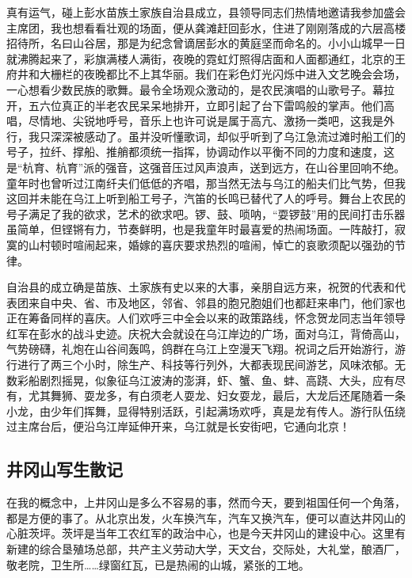 \documentclass{article}
\begin{document}
真有运气，碰上彭水苗族土家族自治县成立，县领导同志们热情地邀请我参加盛会主席团，我也想看看壮观的场面，便从龚滩赶回彭水，住进了刚刚落成的六层高楼招待所，名曰山谷居，那是为纪念曾谪居彭水的黄庭坚而命名的。小小山城早一日就沸腾起来了，彩旗满楼人满街，夜晚的霓虹灯照得店面和人面都通红，北京的王府井和大栅栏的夜晚都比不上其华丽。我们在彩色灯光闪烁中进入文艺晚会会场，一心想看少数民族的歌舞。最令全场观众激动的，是农民演唱的山歌号子。幕拉开，五六位真正的半老农民呆呆地排开，立即引起了台下雷鸣般的掌声。他们高唱，尽情地、尖锐地呼号，音乐上也许可说是属于高亢、激扬一类吧，这我是外行，我只深深被感动了。虽并没听懂歌词，却似乎听到了乌江急流过滩时船工们的号子，拉纤、撑船、推艄都须统一指挥，协调动作以平衡不同的力度和速度，这是“杭育、杭育”派的强音，这强音压过风声浪声，送到远方，在山谷里回响不绝。童年时也曾听过江南纤夫们低低的齐唱，那当然无法与乌江的船夫们比气势，但我这回并未能在乌江上听到船工号子，汽笛的长鸣已替代了人的呼号。舞台上农民的号子满足了我的欲求，艺术的欲求吧。锣、鼓、唢呐，“耍锣鼓”用的民间打击乐器虽简单，但铿锵有力，节奏鲜明，也是我童年时最喜爱的热闹场面。一阵敲打，寂寞的山村顿时喧闹起来，婚嫁的喜庆要求热烈的喧闹，悼亡的哀歌须配以强劲的节律。

自治县的成立确是苗族、土家族有史以来的大事，亲朋自远方来，祝贺的代表和代表团来自中央、省、市及地区，邻省、邻县的胞兄胞姐们也都赶来串门，他们家也正在筹备同样的喜庆。人们欢呼三中全会以来的政策路线，怀念贺龙同志当年领导红军在彭水的战斗史迹。庆祝大会就设在乌江岸边的广场，面对乌江，背倚高山，气势磅礴，礼炮在山谷间轰鸣，鸽群在乌江上空漫天飞翔。祝词之后开始游行，游行进行了两三个小时，除生产、科技等行列外，大都表现民间游艺，风味浓郁。无数彩船剧烈摇晃，似象征乌江波涛的澎湃，虾、蟹、鱼、蚌、高跷、大头，应有尽有，尤其舞狮、耍龙多，有白须老人耍龙、妇女耍龙，最后，大龙后还尾随着一条小龙，由少年们挥舞，显得特别活跃，引起满场欢呼，真是龙有传人。游行队伍绕过主席台后，便沿乌江岸延伸开来，乌江就是长安街吧，它通向北京！
\subsection{井冈山写生散记}
在我的概念中，上井冈山是多么不容易的事，然而今天，要到祖国任何一个角落，都是方便的事了。从北京出发，火车换汽车，汽车又换汽车，便可以直达井冈山的心脏茨坪。茨坪是当年工农红军的政治中心，也是今天井冈山的建设中心。这里有新建的综合垦殖场总部，共产主义劳动大学，天文台，交际处，大礼堂，酿酒厂，敬老院，卫生所……绿窗红瓦，已是热闹的山城，紧张的工地。
\end{document}
